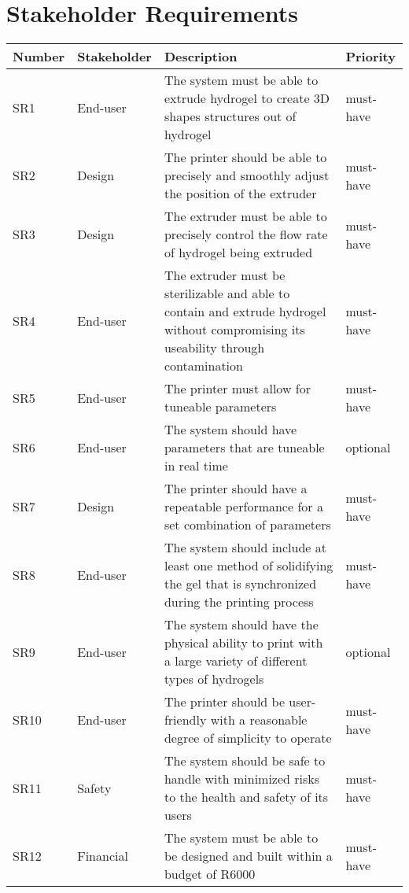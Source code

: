 \chapter{Stakeholder Requirements}

\begin{table}[H]
\centering
\small
\renewcommand{\arraystretch}{1.3}
\begin{tabular}{|l|l|l|l|}
\hline
\textbf{Number} & \textbf{Stakeholder} & \textbf{Description} & \textbf{Priority} \\
\hline
SR1 & End-user & \parbox{8cm}{The system must be able to extrude hydrogel to create 3D shapes structures out of hydrogel} & must-have \\
\hline
SR2 & Design & \parbox{8cm}{The printer should be able to precisely and smoothly adjust the position of the extruder} & must-have \\
\hline
SR3 & Design & \parbox{8cm}{The extruder must be able to precisely control the flow rate of hydrogel being extruded} & must-have \\
\hline
SR4 & End-user & \parbox{8cm}{The extruder must be sterilizable and able to contain and extrude hydrogel without compromising its useability through contamination} & must-have \\
\hline
SR5 & End-user & \parbox{8cm}{The printer must allow for tuneable parameters} & must-have \\
\hline
SR6 & End-user & \parbox{8cm}{The system should have parameters that are tuneable in real time} & optional \\
\hline
SR7 & Design & \parbox{8cm}{The printer should have a repeatable performance for a set combination of parameters} & must-have \\
\hline
SR8 & End-user & \parbox{8cm}{The system should include at least one method of solidifying the gel that is synchronized during the printing process} & must-have \\
\hline
SR9 & End-user & \parbox{8cm}{The system should have the physical ability to print with a large variety of different types of hydrogels} & optional \\
\hline
SR10 & End-user & \parbox{8cm}{The printer should be user-friendly with a reasonable degree of simplicity to operate} & must-have \\
\hline
SR11 & Safety & \parbox{8cm}{The system should be safe to handle with minimized risks to the health and safety of its users} & must-have \\
\hline
SR12 & Financial & \parbox{8cm}{The system must be able to be designed and built within a budget of R6000} & must-have \\

\end{tabular}
\end{table}
